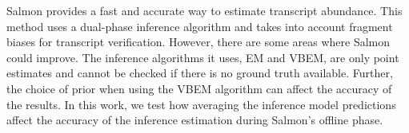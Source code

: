 Salmon provides a fast and accurate way to estimate transcript abundance. This method uses a dual-phase inference algorithm and takes into account fragment biases for transcript verification. However, there are some areas where Salmon could improve. The inference algorithms it uses, EM and VBEM, are only point estimates and cannot be checked if there is no ground truth available. Further, the choice of prior when using the VBEM algorithm can affect the accuracy of the results. In this work, we test how averaging the inference model predictions affect the accuracy of the inference estimation during Salmon’s offline phase. 